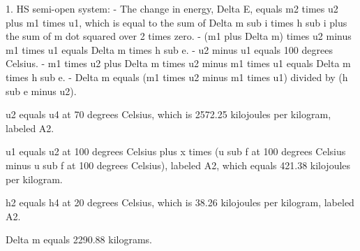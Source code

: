 1. HS semi-open system:
- The change in energy, Delta E, equals m2 times u2 plus m1 times u1, which is equal to the sum of Delta m sub i times h sub i plus the sum of m dot squared over 2 times zero.
- (m1 plus Delta m) times u2 minus m1 times u1 equals Delta m times h sub e.
- u2 minus u1 equals 100 degrees Celsius.
- m1 times u2 plus Delta m times u2 minus m1 times u1 equals Delta m times h sub e.
- Delta m equals (m1 times u2 minus m1 times u1) divided by (h sub e minus u2).

u2 equals u4 at 70 degrees Celsius, which is 2572.25 kilojoules per kilogram, labeled A2.

u1 equals u2 at 100 degrees Celsius plus x times (u sub f at 100 degrees Celsius minus u sub f at 100 degrees Celsius), labeled A2, which equals 421.38 kilojoules per kilogram.

h2 equals h4 at 20 degrees Celsius, which is 38.26 kilojoules per kilogram, labeled A2.

Delta m equals 2290.88 kilograms.